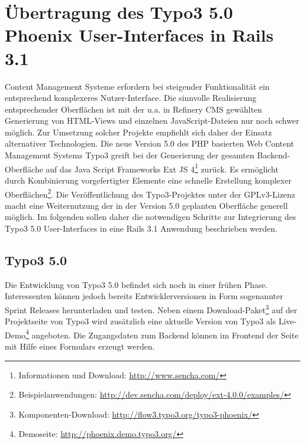\section{Übertragung des Typo3 5.0 Phoenix User-Interfaces in Rails 3.1}
Content Management Systeme erfordern bei steigender Funktionalität ein entsprechend komplexeres Nutzer-Interface. Die sinnvolle Realisierung entsprechender Oberflächen ist mit der u.a. in Refinery CMS gewählten Generierung von HTML-Views und einzelnen JavaScript-Dateien nur noch schwer möglich. Zur Umsetzung solcher Projekte empfiehlt sich daher der Einsatz alternativer Technologien.
Die neue Version 5.0 des PHP basierten Web Content Management Systems Typo3 greift bei der Generierung der gesamten Backend-Oberfläche auf das Java Script Frameworks Ext JS 4\footnote{Informationen und Download: \href{http://www.sencha.com/}{http://www.sencha.com/}} zurück. Es ermöglicht durch Kombinierung vorgefertigter Elemente eine schnelle Erstellung komplexer Oberflächen\footnote{Beispielanwendungen: \href{http://dev.sencha.com/deploy/ext-4.0.0/examples/}{http://dev.sencha.com/deploy/ext-4.0.0/examples/}}.
Die Veröffentlichung des Typo3-Projektes unter der GPLv3-Lizenz macht eine Weiternutzung der in der Version 5.0 geplanten Oberfläche generell möglich. Im folgenden sollen daher die notwendigen Schritte zur Integrierung des Typo3 5.0 User-Interfaces in eine Rails 3.1 Anwendung beschrieben werden.

\subsection{Typo3 5.0}
Die Entwicklung von Typo3 5.0 befindet sich noch in einer frühen Phase. Interessenten können jedoch bereits Entwicklerversionen in Form sogenannter Sprint Releases herunterladen und testen. Neben einem Download-Paket\footnote{Komponenten-Download: \href{http://flow3.typo3.org/typo3-phoenix/}{http://flow3.typo3.org/typo3-phoenix/}} auf der Projektseite von Typo3 wird zusätzlich eine aktuelle Version von Typo3 als Live-Demo\footnote{Demoseite: \href{http://phoenix.demo.typo3.org/}{http://phoenix.demo.typo3.org/}} angeboten. Die Zugangsdaten zum Backend können im Frontend der Seite mit Hilfe eines Formulars erzeugt werden.



